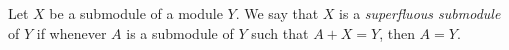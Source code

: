 \documentclass{article}
\begin{document}
Let $X$ be a submodule of a module $Y$.
We say that $X$ is a {\it superfluous submodule} of $Y$
if whenever $A$ is a submodule of $Y$ such that $A + X = Y$,
then $A = Y$.
\end{document}
